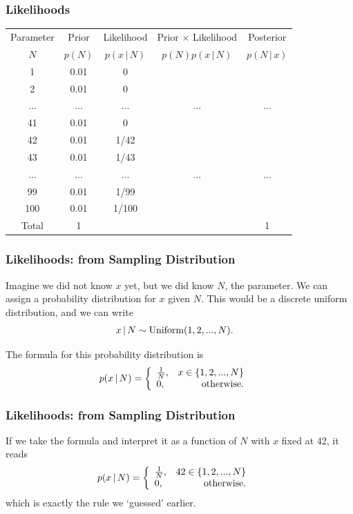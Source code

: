 \documentclass{beamer}
\newcommand{\given}{\,|\,}
\begin{document}
\begin{frame}
\frametitle{Likelihoods}

\centering
{\footnotesize
\begin{tabular}{|c|c|c|c|c|}
\hline
Parameter & Prior & Likelihood & Prior $\times$ Likelihood & Posterior \\
$N$  & $p(N)$ & $p(x \given N)$ & $p(N)p(x\given N)$ & $p(N\given x)$ \\
\hline
1 & 0.01 & 0 & & \\
2 & 0.01  & 0  & & \\
... &... &... & ...&... \\
41 & 0.01 & 0 & & \\
42 & 0.01  & 1/42 & & \\
43 & 0.01 & 1/43 & & \\
... &... &... & ...&... \\
99 & 0.01 & 1/99 & & \\
100   & 0.01 & 1/100 & & \\
\hline
Total & 1 & & & 1 \\
\hline
\end{tabular}
}

\end{frame}


\begin{frame}
\frametitle{Likelihoods: from Sampling Distribution}
Imagine we did not know $x$ yet, but we did know $N$, the parameter.
We can assign a probability distribution for $x$ given $N$.
This would be a discrete uniform distribution, and we can write
\begin{align}
x \given N &\sim \textnormal{Uniform}(1, 2, ..., N).
\end{align}\pause

The formula for this probability distribution is
\begin{align}
p(x \given N) &= \left\{
                    \begin{array}{lr}
                    \frac{1}{N}, & x \in \{1, 2, ..., N\} \\
                    0          , & \textnormal{otherwise}.
                    \end{array}
                 \right.
\end{align}
\end{frame}

\begin{frame}
\frametitle{Likelihoods: from Sampling Distribution}
If we take the formula and interpret it as a function of $N$
with $x$ fixed at 42, it reads
\begin{align}
p(x \given N) &= \left\{
                    \begin{array}{lr}
                    \frac{1}{N}, & 42 \in \{1, 2, ..., N\} \\
                    0          , & \textnormal{otherwise}.
                    \end{array}
                 \right.
\end{align}
which is exactly the rule we `guessed' earlier.


\end{frame}
\end{document}
